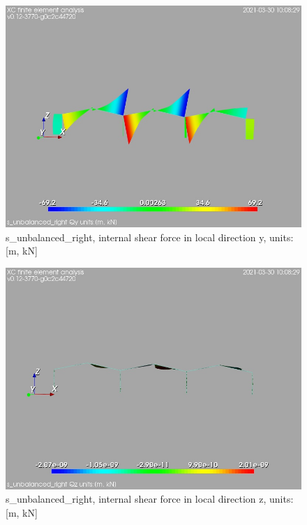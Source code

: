 \begin{figure}
\begin{center}
\includegraphics[width=\linewidth]{calc_results/sole_zeinali/text/graphics/resSimplLC/s_unbalanced_rightallMemberSetQy}
\caption{s_unbalanced_right, internal shear force in local direction y, units:[m, kN]}
\end{center}
\end{figure}
\begin{figure}
\begin{center}
\includegraphics[width=\linewidth]{calc_results/sole_zeinali/text/graphics/resSimplLC/s_unbalanced_rightallMemberSetQz}
\caption{s_unbalanced_right, internal shear force in local direction z, units:[m, kN]}
\end{center}
\end{figure}
